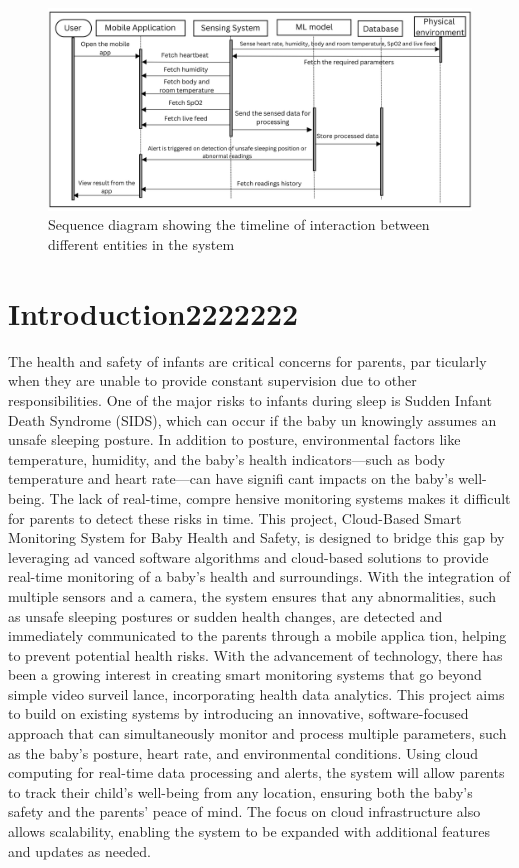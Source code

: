 \documentclass[conference]{IEEEtran}
\begin{document}
\begin{figure}[hbtp]
  \centering
  \includegraphics[scale=0.15]{./pic/seq.png}
  \caption{Sequence diagram showing the timeline of interaction between different entities in the system}
  \label{fig:sequence}
\end{figure}

\section{Introduction2222222}
The health and safety of infants are critical concerns for parents, par
ticularly when they are unable to provide constant supervision due to
 other responsibilities. One of the major risks to infants during sleep is
 Sudden Infant Death Syndrome (SIDS), which can occur if the baby un
knowingly assumes an unsafe sleeping posture. In addition to posture,
 environmental factors like temperature, humidity, and the baby’s health
 indicators—such as body temperature and heart rate—can have signifi
cant impacts on the baby’s well-being. The lack of real-time, compre
hensive monitoring systems makes it difficult for parents to detect these
 risks in time. This project, Cloud-Based Smart Monitoring System for
 Baby Health and Safety, is designed to bridge this gap by leveraging ad
vanced software algorithms and cloud-based solutions to provide real-time
 monitoring of a baby’s health and surroundings. With the integration of
 multiple sensors and a camera, the system ensures that any abnormalities,
 such as unsafe sleeping postures or sudden health changes, are detected
 and immediately communicated to the parents through a mobile applica
tion, helping to prevent potential health risks.
 With the advancement of technology, there has been a growing interest
 in creating smart monitoring systems that go beyond simple video surveil
lance, incorporating health data analytics. This project aims to build on
 existing systems by introducing an innovative, software-focused approach
 that can simultaneously monitor and process multiple parameters, such
 as the baby’s posture, heart rate, and environmental conditions. Using  cloud computing for real-time data processing and alerts, the system will
 allow parents to track their child’s well-being from any location, ensuring
 both the baby’s safety and the parents’ peace of mind. The focus on cloud
 infrastructure also allows scalability, enabling the system to be expanded
 with additional features and updates as needed.
\end{document}
